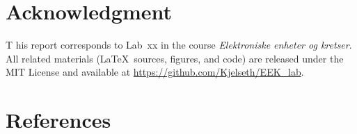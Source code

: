 \documentclass[conference]{IEEEtran}
\begin{document}
\section*{Acknowledgment}
T
his report corresponds to Lab~xx in the course \emph{Elektroniske enheter og kretser}.
All related materials (\LaTeX~sources, figures, and code) are released under the MIT License and available at \url{https://github.com/Kjelseth/EEK_lab}.

\section*{References}

\end{document}
